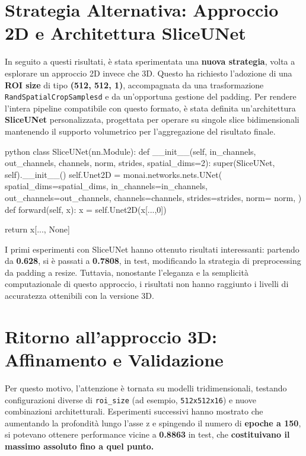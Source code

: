 \section{Strategia Alternativa: Approccio 2D e Architettura SliceUNet}

In seguito a questi risultati, è stata sperimentata una \textbf{nuova strategia}, volta a esplorare un approccio 2D invece che 3D. Questo ha richiesto l’adozione di una \textbf{ROI size} di tipo \textbf{(512, 512, 1)}, accompagnata da una trasformazione \texttt{RandSpatialCropSamplesd} e da un’opportuna gestione del padding. Per rendere l’intera pipeline compatibile con questo formato, è stata definita un’architettura \textbf{SliceUNet} personalizzata, progettata per operare su singole slice bidimensionali mantenendo il supporto volumetrico per l’aggregazione del risultato finale.

\begin{code}{python}
class SliceUNet(nn.Module):
    def __init__(self, in_channels, out_channels, 
                channels, norm, strides, spatial_dims=2):
        super(SliceUNet, self).__init__()
        self.Unet2D = monai.networks.nets.UNet(
            spatial_dims=spatial_dims,
            in_channels=in_channels,
            out_channels=out_channels,
            channels=channels,
            strides=strides,
            norm= norm,
        )
    def forward(self, x):
        x = self.Unet2D(x[...,0]) 

        return x[..., None]
\end{code}



I primi esperimenti con SliceUNet hanno ottenuto risultati interessanti: partendo da \textbf{0.628}, si è passati a \textbf{0.7808}, in test, modificando la strategia di preprocessing da padding a resize. Tuttavia, nonostante l’eleganza e la semplicità computazionale di questo approccio, i risultati non hanno raggiunto i livelli di accuratezza ottenibili con la versione 3D.

\section{Ritorno all’approccio 3D: Affinamento e Validazione}

Per questo motivo, l’attenzione è tornata su modelli tridimensionali, testando configurazioni diverse di \texttt{roi\_size} (ad esempio, \texttt{512x512x16}) e nuove combinazioni architetturali. Esperimenti successivi hanno mostrato che aumentando la profondità lungo l’asse z e spingendo il numero di \textbf{epoche a 150}, si potevano ottenere performance vicine a \textbf{0.8863} in test, che \textbf{costituivano il massimo assoluto fino a quel punto.}

